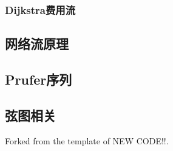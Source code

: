 \documentclass[a4paper, twoside]{article}
\begin{document}
\begin{multicols}{2}
				\subsubsection{Dijkstra费用流}
					



			

			\subsection{网络流原理}
				
			
			\subsection{Prufer序列}
				

			\subsection{弦图相关}
				Forked from the template of NEW CODE!!.
				



			




\end{multicols}
\end{document}
